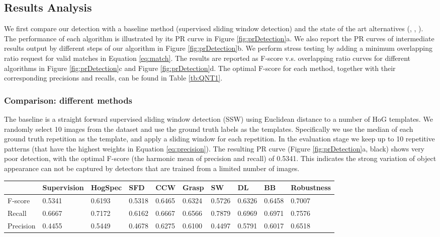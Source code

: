 \documentclass{acmtog}
\begin{document}
\subsection{Results Analysis}

We first compare our detection with a baseline method (supervised sliding window detection) and the state of the art alternatives (\cite{LIPMANsig2010}, \cite{Wu2010DL}, \cite{Liu2013GRASP}). The performance of each algorithm is illustrated by its PR curve in Figure \ref{fig:prDetection}a. We also report the PR curves of intermediate results output by different steps of our algorithm in Figure \ref{fig:prDetection}b. We perform stress testing by adding a minimum overlapping ratio request for valid matches in Equation \ref{eq:match}. The results are reported as F-score v.s. overlapping ratio curves for different algorithms in Figure \ref{fig:prDetection}c and Figure \ref{fig:prDetection}d. The optimal F-score for each method, together with their corresponding precisions and recalls, can be found in Table \ref{tb:QNT1}. 

\subsubsection{Comparison: different methods}

The baseline is a straight forward supervised sliding window detection (SSW) using Euclidean distance to a number of HoG templates. We randomly select 10 images from the dataset and use the ground truth labels as the templates. Specifically we use the median of each ground truth repetition as the template, and apply a sliding window for each repetition. In the evaluation stage we keep up to 10 repetitive patterns (that have the highest weights in Equation \ref{eq:precision}). The resulting PR curve (Figure \ref{fig:prDetection}a, black) shows very poor detection, with the optimal F-score (the harmonic mean of precision and recall) of 0.5341. This indicates the strong variation of object appearance can not be captured by detectors that are trained from a limited number of images. 

\begin{table*}[ht]
    \centering
    \begin{tabular}{ | l | l | l | l | l | l | l | l | l | l |}
    \hline
                         & Supervision  & HogSpec     &  SFD     & CCW      & Grasp      & SW        & DL        & BB       & Robustness \\ \hline
		F-score							 & 0.5341 		  & 0.6193       & 0.5318   & 0.6465   & 0.6324    & 0.5726 	 & 0.6326    & 0.6458   & 0.7007 \\ \hline
    Recall               & 0.6667       & 0.7172       & 0.6162   & 0.6667   & 0.6566    & 0.7879    & 0.6969    & 0.6971   & 0.7576 \\ \hline
    Precision            & 0.4455       & 0.5449       & 0.4678   & 0.6275   & 0.6100    & 0.4497    & 0.5791    & 0.6017   & 0.6518 \\
    \hline
    \end{tabular}
    \caption{Quantitative comparison between different methods.} \label{tb:QNT1}
\end{table*}
\end{document}
